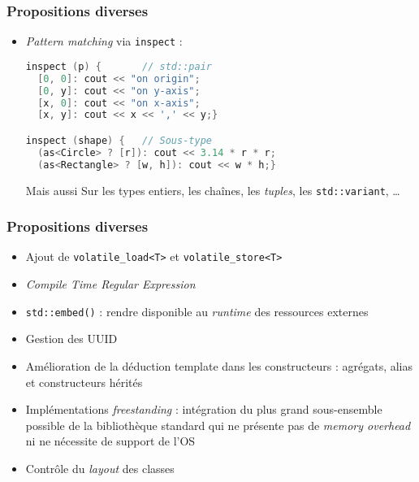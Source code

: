 \documentclass[C++.tex]{subfiles}
\begin{document}
\begin{frame}[fragile]
	\frametitle{Propositions diverses}
	\begin{itemize}
		\item \textit{Pattern matching} via \lstinline|inspect| :
	
		\begin{lstlisting}[language=C++]
inspect (p) {  		// std::pair
  [0, 0]: cout << "on origin";
  [0, y]: cout << "on y-axis";
  [x, 0]: cout << "on x-axis";
  [x, y]: cout << x << ',' << y;}

inspect (shape) {	// Sous-type
  (as<Circle> ? [r]): cout << 3.14 * r * r;
  (as<Rectangle> ? [w, h]): cout << w * h;}\end{lstlisting}

		\begin{block}{Mais aussi}
			Sur les types entiers, les chaînes, les \textit{tuples}, les \lstinline|std::variant|, \ldots
		\end{block}
	\end{itemize}
\end{frame}

\begin{frame}[fragile]
	\frametitle{Propositions diverses}
	\begin{itemize}
		\item Ajout de \lstinline|volatile_load<T>| et \lstinline|volatile_store<T>|
		\item \textit{Compile Time Regular Expression}
		\item \lstinline|std::embed()| : rendre disponible au \textit{runtime} des ressources externes


		\item Gestion des UUID
		\item Amélioration de la déduction template dans les constructeurs : agrégats, alias et constructeurs hérités


		\item Implémentations \textit{freestanding} : intégration du plus grand sous-ensemble possible de la bibliothèque standard qui ne présente pas de \textit{memory overhead} ni ne nécessite de support de l'OS


		\item Contrôle du \textit{layout} des classes

	\end{itemize}
\end{frame}
\end{document}
